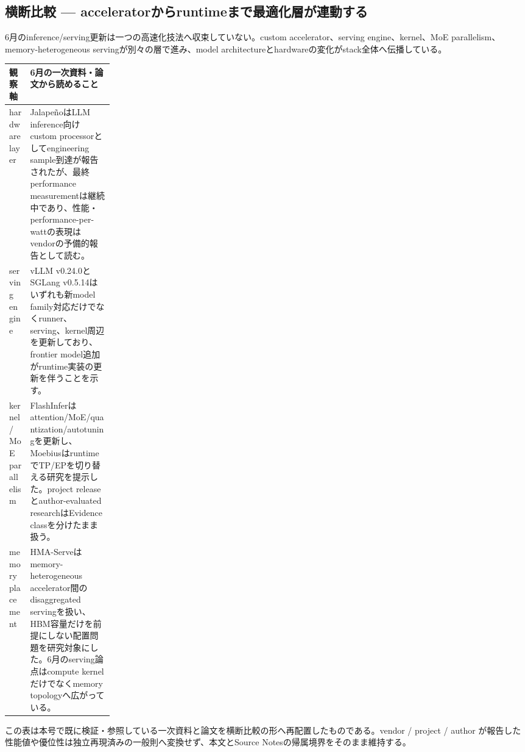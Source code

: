 \subsection*{横断比較 — acceleratorからruntimeまで最適化層が連動する}
6月のinference/serving更新は一つの高速化技法へ収束していない。custom accelerator、serving engine、kernel、MoE parallelism、memory-heterogeneous servingが別々の層で進み、model architectureとhardwareの変化がstack全体へ伝播している。
\medskip
\begin{center}
\small
\renewcommand{\arraystretch}{1.16}
\begin{tabularx}{\linewidth}{@{}p{0.20\linewidth}X@{}}
\toprule
観察軸 & 6月の一次資料・論文から読めること \\
\midrule
hardware layer & JalapeñoはLLM inference向けcustom processorとしてengineering sample到達が報告されたが、最終performance measurementは継続中であり、性能・performance-per-wattの表現はvendorの予備的報告として読む。 \cite{src-855db08b75f6} \\
serving engine & vLLM v0.24.0とSGLang v0.5.14はいずれも新model family対応だけでなくrunner、serving、kernel周辺を更新しており、frontier model追加がruntime実装の更新を伴うことを示す。 \cite{src-6cc910fb0183,src-538cecdad845} \\
kernel / MoE parallelism & FlashInferはattention/MoE/quantization/autotuningを更新し、MoebiusはruntimeでTP/EPを切り替える研究を提示した。project releaseとauthor-evaluated researchはEvidence classを分けたまま扱う。 \cite{src-272a6dac5bcc,src-43606e2afafd} \\
memory placement & HMA-Serveはmemory-heterogeneous accelerator間のdisaggregated servingを扱い、HBM容量だけを前提にしない配置問題を研究対象にした。6月のserving論点はcompute kernelだけでなくmemory topologyへ広がっている。 \cite{src-a66d76643eee} \\
\bottomrule
\end{tabularx}
\renewcommand{\arraystretch}{1.0}
\end{center}
\normalsize
\begin{claimboundary}[この比較の境界]
この表は本号で既に検証・参照している一次資料と論文を横断比較の形へ再配置したものである。vendor / project / author が報告した性能値や優位性は独立再現済みの一般則へ変換せず、本文とSource Notesの帰属境界をそのまま維持する。
\end{claimboundary}
